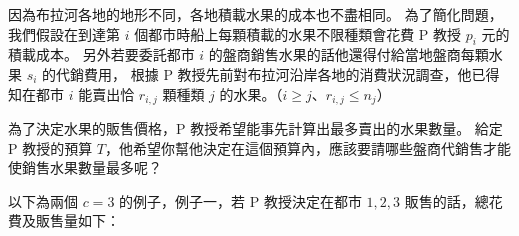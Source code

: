 因為布拉河各地的地形不同，各地積載水果的成本也不盡相同。
為了簡化問題，我們假設在到達第 \begin{math}i\end{math}
個都市時船上每顆積載的水果不限種類會花費 P 教授
\begin{math}p_i\end{math} 元的積載成本。 另外若要委託都市
\begin{math}i\end{math} 的盤商銷售水果的話他還得付給當地盤商每顆水果
\begin{math}s_i\end{math} 的代銷費用， 根據 P
教授先前對布拉河沿岸各地的消費狀況調查，他已得知在都市
\begin{math}i\end{math} 能賣出恰 \begin{math}r_{i,j}\end{math} 顆種類
\begin{math}j\end{math}
的水果。（\begin{math}i \ge j\end{math}、\begin{math}r_{i,j} \le n_j\end{math}）

為了決定水果的販售價格，P 教授希望能事先計算出最多賣出的水果數量。 給定
P 教授的預算
\begin{math}T\end{math}，他希望你幫他決定在這個預算內，應該要請哪些盤商代銷售才能使銷售水果數量最多呢？

\newpage

以下為兩個 \begin{math}c=3\end{math} 的例子，例子一，若 P 教授決定在都市
\begin{math}1,2,3\end{math} 販售的話，總花費及販售量如下：

